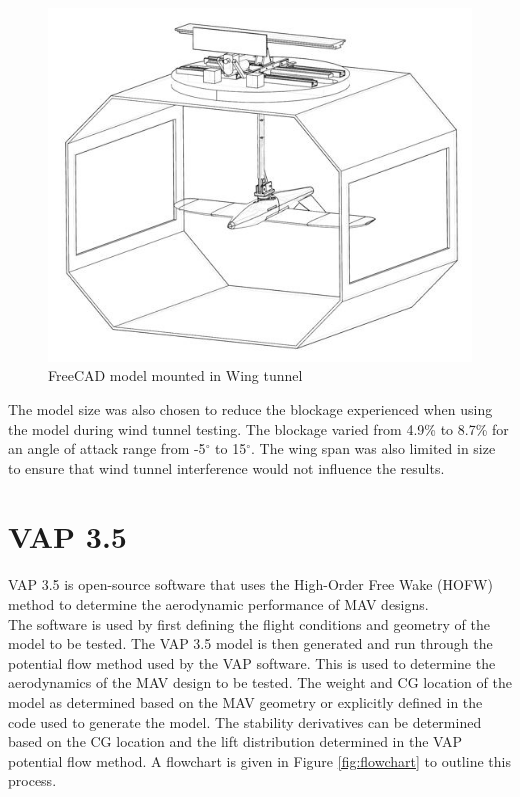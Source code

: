 \begin{figure}
    \centering
    \includegraphics{04_Methodology/Figs/ModelWithtunnel.JPG}
    \caption{FreeCAD model mounted in Wing tunnel }
    \label{fig:modelWithTunnel}
\end{figure}

The model size was also chosen to reduce the blockage experienced when using the model during wind tunnel testing. The blockage varied from 4.9\% to 8.7\% for an angle of attack range from -5$^\circ$ to 15$^\circ$. The wing span was also limited in size to ensure that wind tunnel interference would not influence the results. 



\section{VAP 3.5}
VAP 3.5 is open-source software that uses the High-Order Free Wake (\acrshort{HOFW}) method to determine the aerodynamic performance of MAV designs. \\

The software is used by first defining the flight conditions and geometry of the model to be tested. The VAP 3.5 model is then generated and run through the potential flow method used by the VAP software. This is used to determine the aerodynamics of the MAV design to be tested. The weight and CG location of the model as determined based on the MAV geometry or explicitly defined in the code used to generate the model. The stability derivatives can be determined based on the CG location and the lift distribution determined in the 
 VAP potential flow method. A flowchart is given in Figure \ref{fig:flowchart} to outline this process.

